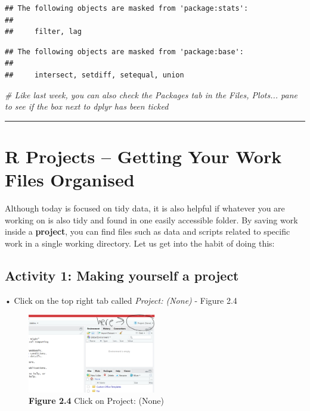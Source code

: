 \documentclass[
]{book}
\newenvironment{Shaded}{\begin{snugshade}}{\end{snugshade}}
\newcommand{\CommentTok}[1]{\textcolor[rgb]{0.56,0.35,0.01}{\textit{#1}}}
\begin{document}
\begin{verbatim}
## The following objects are masked from 'package:stats':
## 
##     filter, lag
\end{verbatim}

\begin{verbatim}
## The following objects are masked from 'package:base':
## 
##     intersect, setdiff, setequal, union
\end{verbatim}

\begin{Shaded}
\begin{Highlighting}[]
\CommentTok{\# Like last week, you can also check the \textquotesingle{}Packages\textquotesingle{} tab in the \textquotesingle{}Files, Plots...\textquotesingle{} pane to see if the box next to \textquotesingle{}dplyr\textquotesingle{} has been ticked}
\end{Highlighting}
\end{Shaded}

\begin{center}\rule{0.5\linewidth}{0.5pt}\end{center}

\hypertarget{r-projects-getting-your-work-files-organised}{%
\section{R Projects -- Getting Your Work Files Organised}\label{r-projects-getting-your-work-files-organised}}

Although today is focused on tidy data, it is also helpful if whatever you are working on is also tidy and found in one easily accessible folder. By saving work inside a \textbf{project}, you can find files such as data and scripts related to specific work in a single working directory. Let us get into the habit of doing this:

\hypertarget{activity-1-making-yourself-a-project}{%
\subsection{Activity 1: Making yourself a project}\label{activity-1-making-yourself-a-project}}

• Click on the top right tab called \emph{Project: (None)} - Figure 2.4

\begin{figure}
\centering
\includegraphics[width=0.5\textwidth,height=\textheight]{Images/project.png}
\caption{\textbf{Figure 2.4} Click on Project: (None)}
\end{figure}
\end{document}
